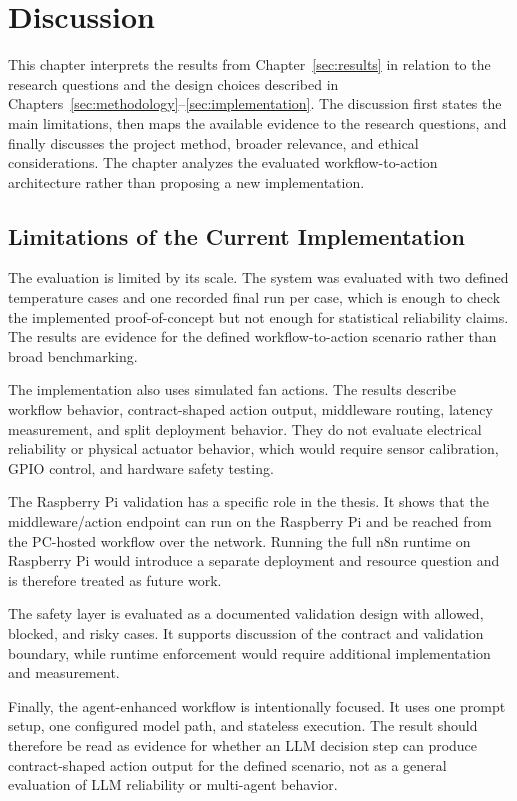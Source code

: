 \section{Discussion}\label{sec:discussion}

This chapter interprets the results from Chapter~\ref{sec:results} in relation to the research questions and the design choices described in Chapters~\ref{sec:methodology}--\ref{sec:implementation}. The discussion first states the main limitations, then maps the available evidence to the research questions, and finally discusses the project method, broader relevance, and ethical considerations. The chapter analyzes the evaluated workflow-to-action architecture rather than proposing a new implementation.

\subsection{Limitations of the Current Implementation}\label{subsec:discussion-limitations-current}

The evaluation is limited by its scale. The system was evaluated with two defined temperature cases and one recorded final run per case, which is enough to check the implemented proof-of-concept but not enough for statistical reliability claims. The results are evidence for the defined workflow-to-action scenario rather than broad benchmarking.


The implementation also uses simulated fan actions. The results describe workflow behavior, contract-shaped action output, middleware routing, latency measurement, and split deployment behavior. They do not evaluate electrical reliability or physical actuator behavior, which would require sensor calibration, GPIO control, and hardware safety testing.


The Raspberry Pi validation has a specific role in the thesis. It shows that the middleware/action endpoint can run on the Raspberry Pi and be reached from the PC-hosted workflow over the network. Running the full n8n runtime on Raspberry Pi would introduce a separate deployment and resource question and is therefore treated as future work.


The safety layer is evaluated as a documented validation design with allowed, blocked, and risky cases. It supports discussion of the contract and validation boundary, while runtime enforcement would require additional implementation and measurement.

Finally, the agent-enhanced workflow is intentionally focused. It uses one prompt setup, one configured model path, and stateless execution. The result should therefore be read as evidence for whether an LLM decision step can produce contract-shaped action output for the defined scenario, not as a general evaluation of LLM reliability or multi-agent behavior.


